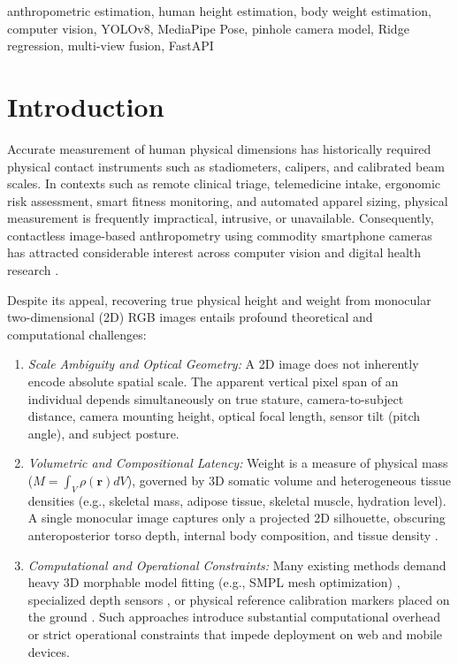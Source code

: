 \documentclass[conference]{IEEEtran}
\begin{document}
\begin{IEEEkeywords}
anthropometric estimation, human height estimation, body weight estimation, computer vision, YOLOv8, MediaPipe Pose, pinhole camera model, Ridge regression, multi-view fusion, FastAPI
\end{IEEEkeywords}

\section{Introduction}
Accurate measurement of human physical dimensions has historically required physical contact instruments such as stadiometers, calipers, and calibrated beam scales. In contexts such as remote clinical triage, telemedicine intake, ergonomic risk assessment, smart fitness monitoring, and automated apparel sizing, physical measurement is frequently impractical, intrusive, or unavailable. Consequently, contactless image-based anthropometry using commodity smartphone cameras has attracted considerable interest across computer vision and digital health research \cite{jan2025, jin2023, altinigne2020}.

Despite its appeal, recovering true physical height and weight from monocular two-dimensional (2D) RGB images entails profound theoretical and computational challenges:
\begin{enumerate}
    \item \textit{Scale Ambiguity and Optical Geometry:} A 2D image does not inherently encode absolute spatial scale. The apparent vertical pixel span of an individual depends simultaneously on true stature, camera-to-subject distance, camera mounting height, optical focal length, sensor tilt (pitch angle), and subject posture.
    \item \textit{Volumetric and Compositional Latency:} Weight is a measure of physical mass ($M = \int_V \rho(\mathbf{r}) dV$), governed by 3D somatic volume and heterogeneous tissue densities (e.g., skeletal mass, adipose tissue, skeletal muscle, hydration level). A single monocular image captures only a projected 2D silhouette, obscuring anteroposterior torso depth, internal body composition, and tissue density \cite{thakkar2021, jiang2019}.
    \item \textit{Computational and Operational Constraints:} Many existing methods demand heavy 3D morphable model fitting (e.g., SMPL mesh optimization) \cite{thakkar2021}, specialized depth sensors \cite{jan2025}, or physical reference calibration markers placed on the ground \cite{suwat2018}. Such approaches introduce substantial computational overhead or strict operational constraints that impede deployment on web and mobile devices.
\end{enumerate}
\end{document}
